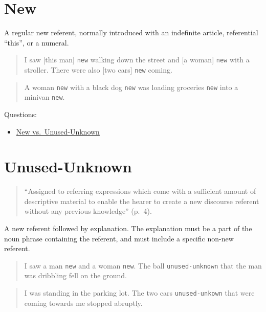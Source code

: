 \documentclass[
]{book}
\providecommand{\tightlist}{%
  \setlength{\itemsep}{0pt}\setlength{\parskip}{0pt}}
\begin{document}
\hypertarget{new}{%
\section{New}\label{new}}

A regular new referent, normally introduced with an indefinite article, referential ``this'', or a numeral.

\begin{quote}
I saw {[}this man{]} \texttt{new} walking down the street and {[}a woman{]} \texttt{new} with a stroller.
There were also {[}two cars{]} \texttt{new} coming.
\end{quote}

\begin{quote}
A woman \texttt{new} with a black dog \texttt{new} was loading groceries \texttt{new} into a minivan \texttt{new}.
\end{quote}

Questions:

\begin{itemize}
\tightlist
\item
  \protect\hyperlink{new-vs.-unused-unknown}{New vs.~Unused-Unknown}
\end{itemize}

\hypertarget{unused-unknown}{%
\section{Unused-Unknown}\label{unused-unknown}}

\begin{quote}
``Assigned to referring expressions which come with a sufficient amount of descriptive material to enable the hearer to create a new discourse referent without any previous knowledge'' (p.~4).
\end{quote}

A new referent followed by explanation.
The explanation must be a part of the noun phrase containing the referent, and must include a specific non-new referent.

\begin{quote}
I saw a man \texttt{new} and a woman \texttt{new}.
The ball \texttt{unused-unknown} that the man was dribbling fell on the ground.
\end{quote}

\begin{quote}
I was standing in the parking lot.
The two cars \texttt{unused-unkown} that were coming towards me stopped abruptly.
\end{quote}
\end{document}
